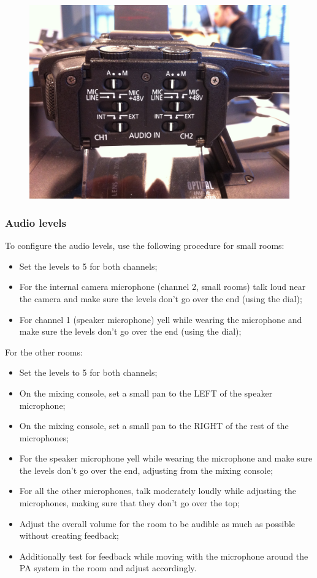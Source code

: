 \documentclass{article}
\begin{document}
\begin{figure}[H]
  \centering
\includegraphics[width = 120mm]{canon_audio_settings.jpg}
\end{figure}

\subsubsection{Audio levels}

To configure the audio levels, use the following procedure for small rooms:
\begin{itemize}
  \item Set the levels to 5 for both channels;
  \item For the internal camera microphone (channel 2, small rooms) talk loud near the camera and make sure the levels don't go over the end (using the dial);
  \item For channel 1 (speaker microphone) yell while wearing the microphone and make sure the levels don't go over the end (using the dial);
\end{itemize}

For the other rooms:

\begin{itemize}
  \item Set the levels to 5 for both channels;
  \item On the mixing console, set a small pan to the LEFT of the speaker microphone;
  \item On the mixing console, set a small pan to the RIGHT of the rest of the microphones;
  \item For the speaker microphone yell while wearing the microphone and make sure the levels don't go over the end, adjusting from the mixing console;
  \item For all the other microphones, talk moderately loudly while adjusting the microphones, making sure that they don't go over the top;
  \item Adjust the overall volume for the room to be audible as much as possible without creating feedback;
  \item Additionally test for feedback while moving with the microphone around the PA system in the room and adjust accordingly.
\end{itemize}
\end{document}
